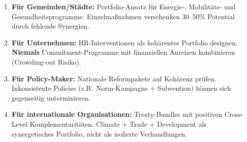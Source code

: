 \begin{enumerate}
\item \textbf{Für Gemeinden/Städte:} Portfolio-Ansatz für Energie-, Mobilitäts- und Gesundheitsprogramme. Einzelmaßnahmen verschenken 30--50\% Potential durch fehlende Synergien.

\item \textbf{Für Unternehmen:} HR-Interventionen als kohärentes Portfolio designen. \textbf{Niemals} Commitment-Programme mit finanziellen Anreizen kombinieren (Crowding-out Risiko).

\item \textbf{Für Policy-Maker:} Nationale Reformpakete auf Kohärenz prüfen. Inkonsistente Policies (z.B.\ Norm-Kampagne + Subvention) können sich gegenseitig unterminieren.

\item \textbf{Für internationale Organisationen:} Treaty-Bundles mit positiven Cross-Level Komplementaritäten. Climate + Trade + Development als synergetisches Portfolio, nicht als isolierte Verhandlungen.
\end{enumerate}


